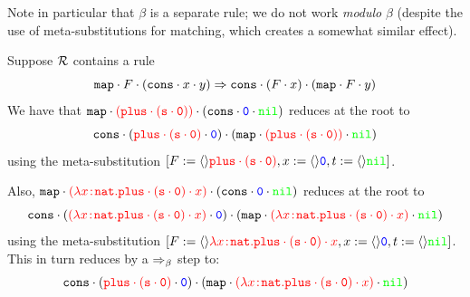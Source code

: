 Note in particular that $\beta$ is a separate rule; we do not work \emph{modulo} $\beta$ (despite
the use of meta-substitutions for matching, which creates a somewhat similar effect).

\begin{example}\label{ex:map}
Suppose $\mathcal{R}$ contains a rule
\[
\mathtt{map} \cdot F \cdot (\mathtt{cons} \cdot x \cdot y) \Rightarrow
\mathtt{cons} \cdot (F \cdot x) \cdot (\mathtt{map} \cdot F \cdot y)
\]
We have that $\mathtt{map} \cdot \textcolor{red}{(\mathtt{plus} \cdot (\mathtt{s} \cdot \mathtt{0}))} \cdot (\mathtt{cons} \cdot \textcolor{blue}{\mathtt{0}} \cdot \textcolor{green}{\mathtt{nil}})$
reduces at the root to
\[\mathtt{cons} \cdot (\textcolor{red}{\mathtt{plus} \cdot (\mathtt{s} \cdot \mathtt{0})} \cdot \textcolor{blue}{\mathtt{0}}) \cdot (\mathtt{map} \cdot \textcolor{red}{(\mathtt{plus} \cdot (\mathtt{s} \cdot \mathtt{0}))} \cdot \textcolor{green}{\mathtt{nil}})\]
using the meta-substitution $[F:=\langle \rangle\textcolor{red}{\mathtt{plus} \cdot (\mathtt{s} \cdot \mathtt{0})},x:=\langle \rangle\textcolor{blue}{\mathtt{0}},t:=\langle \rangle\textcolor{green}{\mathtt{nil}}]$.

Also, $\app{
        \app{
          \symb{map}
        }{
          \textcolor{red}{(\abs{\avar}{\nat}{
            \app{\app{
              \symb{plus}
            }{
              (\app{\suc}{\nul})
            }}{
              \avar
            }
          })}
        }
      }{
        (\app{\app{\cons}{\textcolor{blue}{\nul}}}{\textcolor{green}{\nil}})
      }$
reduces at the root to
\[
  \app{
    \app{
      \cons
    }{(
      \app{
        \textcolor{red}{
          (\abs{\avar}{\nat}{
            \app{\app{
              \symb{plus}
            }{
              (\app{\suc}{\nul})
            }}{
              \avar
            }
          })
        }
      }{
        \textcolor{blue}{\nul}
      }
    )}
  }{
    (\app{
      \app{
        \symb{map}
      }{
        \textcolor{red}{
          (\abs{\avar}{\nat}{
            \app{\app{
              \symb{plus}
            }{
              (\app{\suc}{\nul})
            }}{
              \avar
            }
          })
        }
      }
    }{
      \textcolor{green}{\nil}
    })
  }
\]
using the meta-substitution $[F:=\langle \rangle\textcolor{red}{\lambda x\!:\!\mathtt{nat}.\mathtt{plus} \cdot (\mathtt{s} \cdot \mathtt{0}) \cdot x},
  x:=\langle \rangle\textcolor{blue}{\mathtt{0}},t:=\langle \rangle\textcolor{green}{\mathtt{nil}}]$.
This in turn reduces by a $\Rightarrow_{\beta}$ step to:
\[
  \app{
    \app{
      \cons
    }{(
      \app{
        \textcolor{red}{
            \app{
              \symb{plus}
            }{
              (\app{\suc}{\nul})
            }
        }
      }{
        \textcolor{blue}{\nul}
      }
    )}
  }{
    (\app{
      \app{
        \symb{map}
      }{
        \textcolor{red}{
          (\abs{\avar}{\nat}{
            \app{\app{
              \symb{plus}
            }{
              (\app{\suc}{\nul})
            }}{
              \avar
            }
          })
        }
      }
    }{
      \textcolor{green}{\nil}
    })
  }
\]
\end{example}

